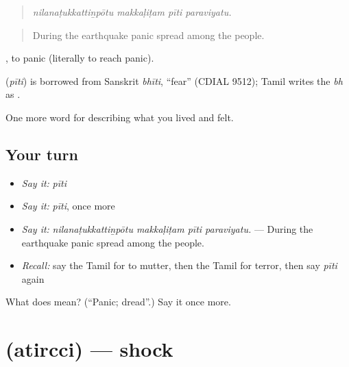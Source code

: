 \begin{quote}
\emph{nilanaṭukkattiṉpōtu makkaḷiṭam pīti paraviyatu.}
\end{quote}

\begin{quote}
During the earthquake panic spread among the people.
\end{quote}

 , to panic (literally to reach panic).

\begin{cousinweb}
\textbf{} (\emph{pīti}) is borrowed from Sanskrit \emph{bhīti}, \textquotedblleft{}fear\textquotedblright{} (CDIAL 9512); Tamil writes the \emph{bh} as .
\end{cousinweb}

\begin{grammarlens}[title={What you've built}]
One more word for describing what you lived and felt.
\end{grammarlens}

\subsection*{Your turn}
\begin{itemize}
\raggedright
  \item \emph{Say it:} \emph{pīti}
  \item \emph{Say it:} \emph{pīti}, once more
  \item \emph{Say it:} \emph{nilanaṭukkattiṉpōtu makkaḷiṭam pīti paraviyatu.} — During the earthquake panic spread among the people.
  \item \emph{Recall:} say the Tamil for to mutter, then the Tamil for terror, then say \emph{pīti} again
\end{itemize}

\begin{tcolorbox}[breakable,colback=teal!4,colframe=teal!35!black,title={Before you move on}]
What does  mean? (\textquotedblleft{}Panic; dread\textquotedblright{}.) Say it once more.
\end{tcolorbox}
\section[\texorpdfstring{\ta{அதிர்ச்சி} (atircci)}{அதிர்ச்சி (atircci)}]{ (atircci) — shock}

\label{lesson:TA-C454-atircci}



